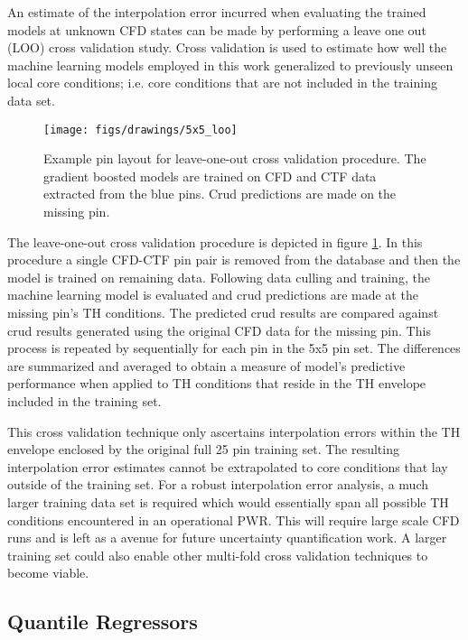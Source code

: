 An estimate of the interpolation error incurred when evaluating the trained models at unknown CFD states can be made by performing a leave one out (LOO) cross validation study.  Cross validation is used to estimate how well the machine learning models employed in this work generalized to previously unseen local core conditions; i.e. core conditions that are not included in the training data set.

\begin{figure}[h]
    \centering
    \texttt{[image: figs/drawings/5x5\_loo]}
    \caption[Example pin layout for leave-one-out cross validation procedure.]{Example pin layout for leave-one-out cross validation procedure.  The gradient boosted models are trained on CFD and CTF data extracted from the blue pins.  Crud predictions are made on the missing pin.}
    \label{fig:5x5loo}
\end{figure}

The leave-one-out cross validation procedure is depicted in figure \ref{fig:5x5loo}.  In this procedure a single CFD-CTF pin pair is removed from the database and then the model is trained on remaining data.  Following data culling and training, the machine learning model is evaluated and crud predictions are made
at the missing pin's TH conditions.  The predicted crud results are compared against crud results generated using the original CFD data for the missing pin.  This process is repeated by sequentially for each pin in the 5x5 pin set.  The differences are summarized and averaged to obtain a measure of model's predictive performance when applied to TH conditions that reside in the TH envelope included in the training set.

This cross validation technique only ascertains interpolation errors within the TH envelope enclosed by the original full 25 pin training set.  The resulting interpolation error estimates cannot be extrapolated to core conditions that lay outside of the training set.  For a robust interpolation error analysis, a much larger training data set is required which would essentially span all possible TH conditions encountered in an operational PWR.  This will require large scale CFD runs and is left as a avenue for future uncertainty quantification work.  A larger training set could also enable other multi-fold cross validation techniques to become viable.

\subsection{Quantile Regressors}


